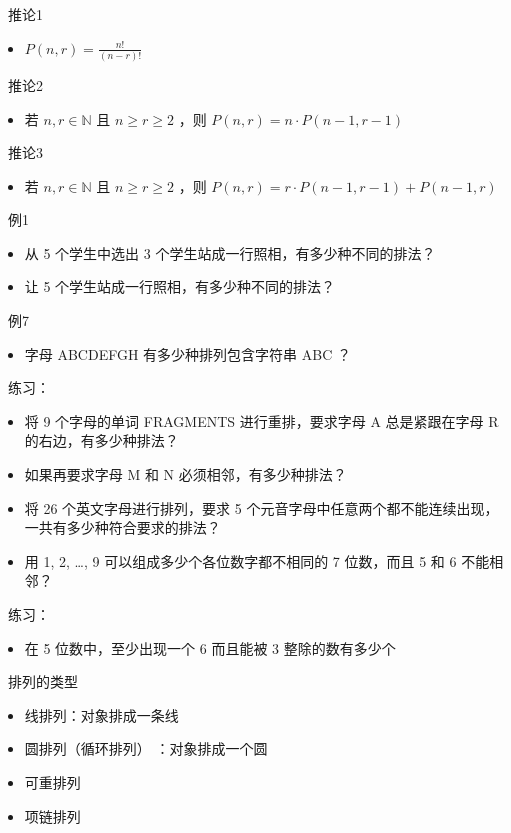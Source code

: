 \documentclass[UTF8]{report}
\theoremstyle{MyLineTheoremStyle} %
\theoremstyle{MyBlockTheoremStyle} %
\theoremstyle{MySubsubsectionStyle} %
\begin{document}
\textbullet\ 推论1
\begin{itemize}
    \item $P(n, r) = \frac{n!}{(n-r)!}$
\end{itemize}

\textbullet\ 推论2
\begin{itemize}
    \item 若 $n, r \in \mathbb{N}$ 且 $n \geq r \geq 2$ ，则 $P(n, r) = n \cdot P(n - 1, r - 1)$
\end{itemize}

\textbullet\ 推论3
\begin{itemize}
    \item 若 $n, r \in \mathbb{N}$ 且 $n \geq r \geq 2$ ，则 $P(n, r) = r \cdot P(n - 1, r - 1) + P(n - 1, r)$
\end{itemize}

\textbullet\ 例1
\begin{itemize}
    \item 从 5 个学生中选出 3 个学生站成一行照相，有多少种不同的排法？
    \item 让 5 个学生站成一行照相，有多少种不同的排法？
\end{itemize}

\textbullet\ 例7
\begin{itemize}
    \item 字母 ABCDEFGH 有多少种排列包含字符串 ABC ？
\end{itemize}

\textbullet\ 练习：
\begin{itemize}
    \item 将 9 个字母的单词 FRAGMENTS 进行重排，要求字母 A 总是紧跟在字母 R 的右边，有多少种排法？
    \item 如果再要求字母 M 和 N 必须相邻，有多少种排法？
    \item 将 26 个英文字母进行排列，要求 5 个元音字母中任意两个都不能连续出现，一共有多少种符合要求的排法？
    \item 用 1, 2, \ldots , 9 可以组成多少个各位数字都不相同的 7 位数，而且 5 和 6 不能相邻？
\end{itemize}

\textbullet\ 练习：
\begin{itemize}
    \item 在 5 位数中，至少出现一个 6 而且能被 3 整除的数有多少个
\end{itemize}

\textbullet\ 排列的类型
\begin{itemize}
    \item 线排列：对象排成一条线
    \item 圆排列（循环排列） ：对象排成一个圆
    \item 可重排列
    \item 项链排列
\end{itemize}
\end{document}
